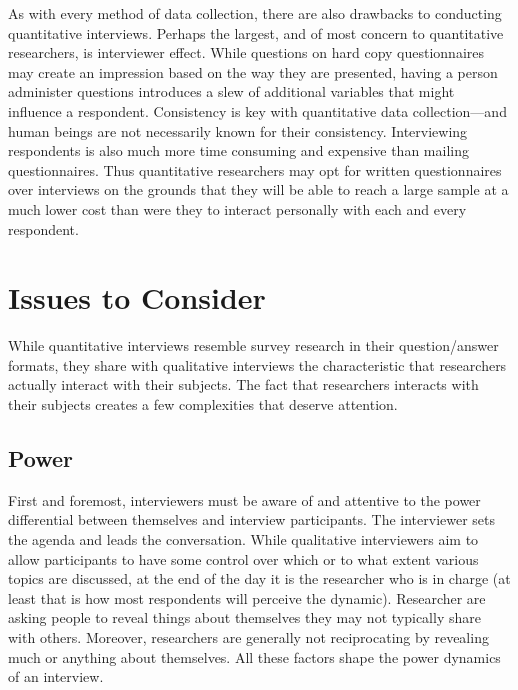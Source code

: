 As with every method of data collection, there are also drawbacks to conducting quantitative interviews. Perhaps the largest, and of most concern to quantitative researchers, is interviewer effect. While questions on hard copy questionnaires may create an impression based on the way they are presented, having a person administer questions introduces a slew of additional variables that might influence a respondent. Consistency is key with quantitative data collection---and human beings are not necessarily known for their consistency. Interviewing respondents is also much more time consuming and expensive than mailing questionnaires. Thus quantitative researchers may opt for written questionnaires over interviews on the grounds that they will be able to reach a large sample at a much lower cost than were they to interact personally with each and every respondent.

\section{Issues to Consider}

While quantitative interviews resemble survey research in their question/answer formats, they share with qualitative interviews the characteristic that researchers actually interact with their subjects. The fact that researchers interacts with their subjects creates a few complexities that deserve attention.

\subsection{Power}

First and foremost, interviewers must be aware of and attentive to the power differential between themselves and interview participants. The interviewer sets the agenda and leads the conversation. While qualitative interviewers aim to allow participants to have some control over which or to what extent various topics are discussed, at the end of the day it is the researcher who is in charge (at least that is how most respondents will perceive the dynamic). Researcher are asking people to reveal things about themselves they may not typically share with others. Moreover, researchers are generally not reciprocating by revealing much or anything about themselves. All these factors shape the power dynamics of an interview.

